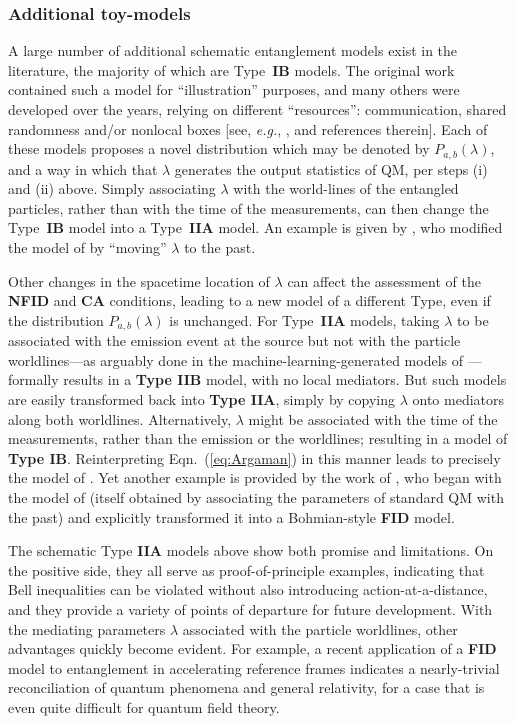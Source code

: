 \documentclass[rmp, aps, preprint, longbibliography]{revtex4-1}
\begin{document}
\subsubsection{Additional toy-models}
\label{sec:more_toys}

A large number of additional schematic entanglement models exist in the literature, the majority of which are Type~{\bf IB} models.  The original \textcite{bell1964} work contained such a model for ``illustration'' purposes, and many others were developed over the years, relying on different ``resources'': communication, shared randomness and/or nonlocal boxes [see, \emph{e.g.}, \textcite{degorre2005}, and references therein].  Each of these models proposes a novel distribution which may be denoted by $P_{a,b}(\lambda)$, and a way in which that $\lambda$ generates the output statistics of QM, per steps (i) and (ii) above.  Simply associating $\lambda$ with the world-lines of the entangled particles, rather than with the time of the measurements, can then change the Type~{\bf IB} model into a Type~{\bf IIA} model.  An example is given by \textcite{barrett2011}, who modified the model of \textcite{toner2003,degorre2005} by ``moving'' $\lambda$ to the past.

Other changes in the spacetime location of $\lambda$ can affect the assessment of the {\bf NFID} and {\bf CA} conditions, leading to a new model of a different Type, even if the distribution $P_{a,b}(\lambda)$ is unchanged.  For Type~{\bf IIA} models, taking $\lambda$ to be associated with the emission event at the source but not with the particle worldlines---as arguably done in the machine-learning-generated models of \textcite{weinstein2017,weinstein2018}---formally results in a {\bf Type IIB} model, with no local mediators.  But such models are easily transformed back into {\bf Type IIA}, simply by copying $\lambda$ onto mediators along both worldlines.  Alternatively, $\lambda$ might be associated with the time of the measurements, rather than the emission or the worldlines; resulting in a model of {\bf Type IB}.  Reinterpreting Eqn.~(\ref{eq:Argaman}) in this manner leads to precisely the model of \textcite{dilorenzo2012}.  Yet another example is provided by the work of \textcite{sen2018}, who began with the model of \textcite{brans1988} (itself obtained by associating the parameters of standard QM with the past) and explicitly transformed it into a Bohmian-style {\bf FID} model.

The schematic Type {\bf IIA} models above show both promise and limitations.  On the positive side, they all serve as proof-of-principle examples, indicating that Bell inequalities can be violated without also introducing action-at-a-distance, and they provide a variety of points of departure for future development.  With the mediating parameters $\lambda$ associated with the particle worldlines, other advantages quickly become evident.  For example, a recent application \cite{sen2019} of a {\bf FID} model to entanglement in accelerating reference frames indicates a nearly-trivial reconciliation of quantum phenomena and general relativity, for a case that is even quite difficult for quantum field theory.  
\end{document}
